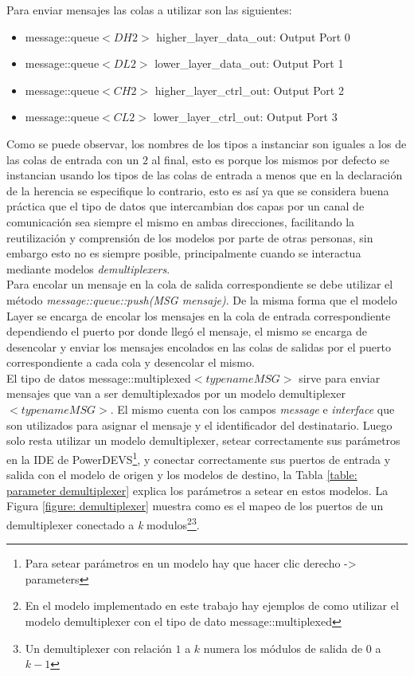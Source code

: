 \documentclass[10pt,a4paper]{article}
\begin{document}
Para enviar mensajes las colas a utilizar son las siguientes:
\begin{itemize}
\item message::queue$<DH2>$ higher\_layer\_data\_out: Output Port 0 
\item message::queue$<DL2>$ lower\_layer\_data\_out:  Output Port 1
\item message::queue$<CH2>$ higher\_layer\_ctrl\_out: Output Port 2
\item message::queue$<CL2>$ lower\_layer\_ctrl\_out:  Output Port 3
\end{itemize}

Como se puede observar, los nombres de los tipos a instanciar son iguales a los de las colas de entrada con un $2$ al final, esto es porque los mismos por defecto se instancian usando los tipos de las colas de entrada a menos que en la declaración de la herencia se especifique lo contrario, esto es así ya que se considera buena práctica que el tipo de datos que intercambian dos capas por un canal de comunicación sea siempre el mismo en ambas direcciones, facilitando la reutilización y comprensión de los modelos por parte de otras personas, sin embargo esto no es siempre posible, principalmente cuando se interactua mediante modelos \textit{demultiplexers}. \\

Para encolar un mensaje en la cola de salida correspondiente se debe utilizar el método \textit{message::queue::push(MSG mensaje)}. De la misma forma que el modelo Layer se encarga de encolar los mensajes en la cola de entrada correspondiente dependiendo el puerto por donde llegó el mensaje, el mismo se encarga de desencolar y enviar los mensajes encolados en las colas de salidas por el puerto correspondiente a cada cola y desencolar el mismo. \\

El tipo de datos message::multiplexed$<typename MSG>$ sirve para enviar mensajes que van a ser demultiplexados por un modelo demultiplexer$<typename MSG>$. El mismo cuenta con los campos \textit{message} e \textit{interface} que son utilizados para asignar el mensaje y el identificador del destinatario. Luego solo resta utilizar un modelo demultiplexer, setear correctamente sus parámetros en la IDE de PowerDEVS\footnote{Para setear parámetros en un modelo hay que hacer clic derecho -> parameters}, y conectar correctamente sus puertos de entrada y salida con el modelo de origen y los modelos de destino, la Tabla \ref{table: parameter demultiplexer} explica los parámetros a setear en estos modelos. La Figura \ref{figure: demultiplexer} muestra como es el mapeo de los puertos de un demultiplexer conectado a \textit{k} modulos\footnote{En el modelo implementado en este trabajo hay ejemplos de como utilizar el modelo demultiplexer con el tipo de dato message::multiplexed}\footnote{Un demultiplexer con relación $1$ a $k$ numera los módulos de salida de $0$ a $k-1$}. \\
\end{document}
